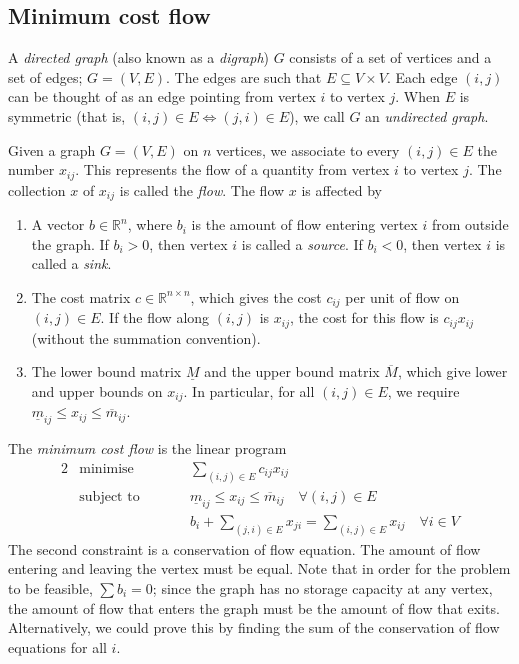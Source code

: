 \subsection{Minimum cost flow}
\begin{definition}
	A \textit{directed graph} (also known as a \textit{digraph}) \( G \) consists of a set of vertices and a set of edges; \( G = (V, E) \).
	The edges are such that \( E \subseteq V \times V \).
	Each edge \( (i,j) \) can be thought of as an edge pointing from vertex \( i \) to vertex \( j \).
	When \( E \) is symmetric (that is, \( (i,j) \in E \iff (j,i) \in E \)), we call \( G \) an \textit{undirected graph}.
\end{definition}
\begin{definition}
	Given a graph \( G = (V, E) \) on \( n \) vertices, we associate to every \( (i,j) \in E \) the number \( x_{ij} \).
	This represents the flow of a quantity from vertex \( i \) to vertex \( j \).
	The collection \( x \) of \( x_{ij} \) is called the \textit{flow}.
	The flow \( x \) is affected by
	\begin{enumerate}
		\item A vector \( b \in \mathbb R^n \), where \( b_i \) is the amount of flow entering vertex \( i \) from outside the graph.
		      If \( b_i > 0 \), then vertex \( i \) is called a \textit{source}.
		      If \( b_i < 0 \), then vertex \( i \) is called a \textit{sink}.
		\item The cost matrix \( c \in \mathbb R^{n \times n} \), which gives the cost \( c_{ij} \) per unit of flow on \( (i,j) \in E \).
		      If the flow along \( (i,j) \) is \( x_{ij} \), the cost for this flow is \( c_{ij}x_{ij} \) (without the summation convention).
		\item The lower bound matrix \( \underline{M} \) and the upper bound matrix \( \overline{M} \), which give lower and upper bounds on \( x_{ij} \).
		      In particular, for all \( (i,j) \in E \), we require \( \underline m_{ij} \leq x_{ij} \leq \overline m_{ij} \).
	\end{enumerate}
\end{definition}
\begin{definition}
	The \textit{minimum cost flow} is the linear program
	\begin{alignat*}{2}
		 & \text{minimise}   & \qquad & \sum_{(i,j) \in E}c_{ij}x_{ij}                                                   \\
		 & \text{subject to} &        & \underline m_{ij} \leq x_{ij} \leq \overline m_{ij} \quad \forall (i,j) \in E    \\
		 &                   &        & b_i + \sum_{(j,i) \in E} x_{ji} = \sum_{(i,j)\in E} x_{ij} \quad \forall i \in V
	\end{alignat*}
	The second constraint is a conservation of flow equation.
	The amount of flow entering and leaving the vertex must be equal.
	Note that in order for the problem to be feasible, \( \sum b_i = 0 \); since the graph has no storage capacity at any vertex, the amount of flow that enters the graph must be the amount of flow that exits.
	Alternatively, we could prove this by finding the sum of the conservation of flow equations for all \( i \).
\end{definition}
